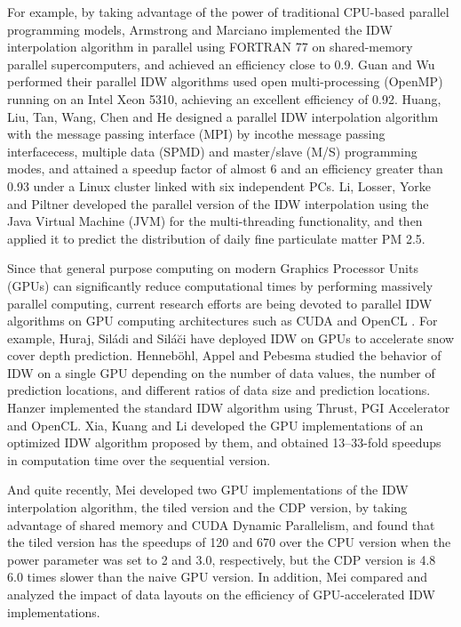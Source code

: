 \documentclass[fleqn,11pt]{wlscirep}
\begin{document}
For example, by taking advantage of the power of traditional CPU-based 
parallel programming models, Armstrong and Marciano \cite{07,08} 
implemented the IDW interpolation algorithm in parallel using FORTRAN 77 on 
shared-memory parallel supercomputers, and achieved an efficiency close to 
0.9. Guan and Wu \cite{09} performed their parallel IDW algorithms 
used open multi-processing (OpenMP) running on an Intel Xeon 5310, achieving 
an excellent efficiency of 0.92. Huang, Liu, Tan, Wang, Chen 
and He \cite{21} designed a parallel IDW interpolation algorithm with the message 
passing interface (MPI) by incothe message passing interfacecess, multiple 
data (SPMD) and master/slave (M/S) programming modes, and attained a speedup 
factor of almost 6 and an efficiency greater than 0.93 under a Linux cluster 
linked with six independent PCs. Li, Losser, Yorke and Piltner \cite{22} developed the parallel 
version of the IDW interpolation using the Java Virtual Machine (JVM) for 
the multi-threading functionality, and then applied it to predict the 
distribution of daily fine particulate matter PM 2.5.


Since that general purpose computing on modern Graphics Processor Units 
(GPUs) can significantly reduce computational times by performing massively 
parallel computing, current research efforts are being devoted to parallel 
IDW algorithms on GPU computing architectures such as CUDA \cite{23}
 and OpenCL \cite{24}. For example, Huraj, Sil\'{a}di and Sil\'{a}\u{c}i \cite{25,26}
have deployed IDW on GPUs to accelerate snow cover depth prediction. 
Henneb\"{o}hl, Appel and Pebesma \cite{13} studied the behavior of IDW on a 
single GPU depending on the number of data values, the number of prediction 
locations, and different ratios of data size and prediction locations. 
Hanzer \cite{27} implemented the standard IDW algorithm using Thrust, PGI 
Accelerator and OpenCL. Xia, Kuang and Li \cite{28,29} developed the GPU 
implementations of an optimized IDW algorithm proposed by them, and obtained 
13--33-fold speedups in computation time over the sequential version.


And quite recently, Mei \cite{30} developed two GPU implementations of 
the IDW interpolation algorithm, the tiled version and the CDP version, by 
taking advantage of shared memory and CUDA Dynamic Parallelism, and found 
that the tiled version has the speedups of 120 and 670 over the CPU 
version when the power parameter  was set to 2 and 3.0, respectively, but the 
CDP version is 4.8  6.0 times slower than the naive GPU version. In 
addition, Mei \cite{31} compared and analyzed the impact of data layouts 
on the efficiency of GPU-accelerated IDW implementations.
\end{document}
